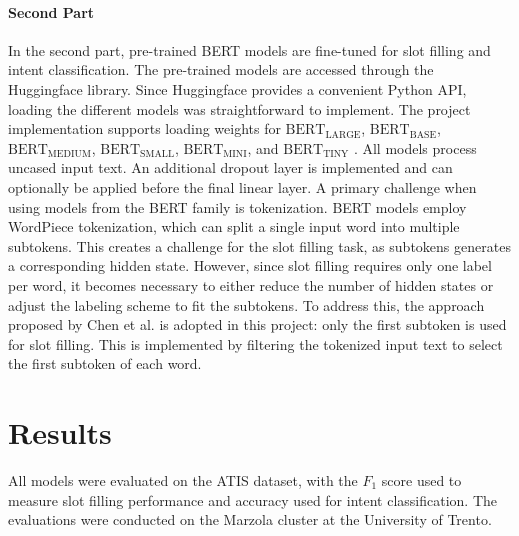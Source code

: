 \documentclass[a4paper]{article}
\begin{document}
\paragraph*{Second Part}
In the second part, pre-trained BERT models \cite{devlin2019bertpretrainingdeepbidirectional} are fine-tuned for slot filling and intent classification. The pre-trained models are accessed through the Huggingface library. Since Huggingface provides a convenient Python API, loading the different models was straightforward to implement. The project implementation supports loading weights for $\text{BERT}_{\text{LARGE}}$, $\text{BERT}_{\text{BASE}}$, $\text{BERT}_{\text{MEDIUM}}$, $\text{BERT}_{\text{SMALL}}$, $\text{BERT}_{\text{MINI}}$, and $\text{BERT}_{\text{TINY}}$ \cite{devlin2019bertpretrainingdeepbidirectional, turc2019wellreadstudentslearnbetter}. All models process uncased input text. An additional dropout layer is implemented and can optionally be applied before the final linear layer. A primary challenge when using models from the BERT family is tokenization. BERT models employ WordPiece \cite{wu2016googlesneuralmachinetranslation} tokenization, which can split a single input word into multiple subtokens. This creates a challenge for the slot filling task, as subtokens generates a corresponding hidden state. However, since slot filling requires only one label per word, it becomes necessary to either reduce the number of hidden states or adjust the labeling scheme to fit the subtokens. To address this, the approach proposed by Chen et al. \cite{chen2019bertjointintentclassification} is adopted in this project: only the first subtoken is used for slot filling. This is implemented by filtering the tokenized input text to select the first subtoken of each word.

\section{Results}
All models were evaluated on the ATIS dataset, with the $F_1$ score used to measure slot filling performance and accuracy used for intent classification. The evaluations were conducted on the Marzola cluster at the University of Trento.
\end{document}
